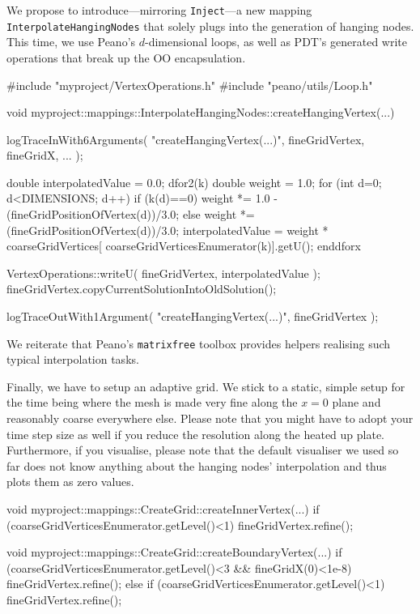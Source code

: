 We propose to introduce---mirroring \texttt{Inject}---a new mapping
\texttt{InterpolateHangingNodes} that solely plugs into the generation of hanging nodes.
This time, we use Peano's $d$-dimensional loops, as well as PDT's generated
write operations that break up the OO encapsulation.

\begin{code}
#include "myproject/VertexOperations.h"
#include "peano/utils/Loop.h"

void myproject::mappings::InterpolateHangingNodes::createHangingVertex(...) {
  logTraceInWith6Arguments( "createHangingVertex(...)", fineGridVertex, fineGridX, ... );

  double interpolatedValue = 0.0;
  dfor2(k)
    double weight = 1.0;
    for (int d=0; d<DIMENSIONS; d++) {
      if (k(d)==0) {
        weight *= 1.0 - (fineGridPositionOfVertex(d))/3.0;
      }
      else {
        weight *= (fineGridPositionOfVertex(d))/3.0;
      }
    }
    interpolatedValue = weight * coarseGridVertices[ coarseGridVerticesEnumerator(k)].getU();
  enddforx

  VertexOperations::writeU( fineGridVertex, interpolatedValue );
  fineGridVertex.copyCurrentSolutionIntoOldSolution();

  logTraceOutWith1Argument( "createHangingVertex(...)", fineGridVertex );
}
\end{code}

\noindent
We reiterate that Peano's \texttt{matrixfree} toolbox provides helpers realising
such typical interpolation tasks.

Finally, we have to setup an adaptive grid. We stick to a static, simple setup
for the time being where the mesh is made very fine along the $x=0$ plane and
reasonably coarse everywhere else.
Please note that you might have to adopt your time step size as well if you
reduce the resolution along the heated up plate.
Furthermore, if you visualise, please note that the default visualiser we used
so far does not know anything about the hanging nodes' interpolation and thus
plots them as zero values. 

\begin{code}
void myproject::mappings::CreateGrid::createInnerVertex(...) {
 if (coarseGridVerticesEnumerator.getLevel()<1) {
  fineGridVertex.refine();
 }
}

void myproject::mappings::CreateGrid::createBoundaryVertex(...) {
 if (coarseGridVerticesEnumerator.getLevel()<3 && fineGridX(0)<1e-8) {
  fineGridVertex.refine();
 }
 else if (coarseGridVerticesEnumerator.getLevel()<1) {
  fineGridVertex.refine();
 }
}
\end{code}


